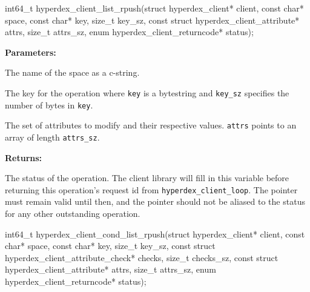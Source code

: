 \funcsep
\begin{ccode}
int64_t hyperdex_client_list_rpush(struct hyperdex_client* client,
                const char* space,
                const char* key, size_t key_sz,
                const struct hyperdex_client_attribute* attrs, size_t attrs_sz,
                enum hyperdex_client_returncode* status);
\end{ccode}
\funcdesc 

\noindent\textbf{Parameters:}
\begin{description}[labelindent=\widthof{{\texttt{attrs}, \texttt{attrs\_sz}}},leftmargin=*,noitemsep,nolistsep,align=right]
\item[\texttt{space}] The name of the space as a c-string.
\item[\texttt{key}, \texttt{key\_sz}] The key for the operation where \texttt{key} is a bytestring and \texttt{key\_sz} specifies the number of bytes in \texttt{key}.
\item[\texttt{attrs}, \texttt{attrs\_sz}] The set of attributes to modify and their respective values.  \texttt{attrs} points to an array of length \texttt{attrs\_sz}.
\end{description}

\noindent\textbf{Returns:}
\begin{description}[labelindent=\widthof{{\texttt{status}}},leftmargin=*,noitemsep,nolistsep,align=right]
\item[\texttt{status}] The status of the operation.  The client library will fill in this variable before returning this operation's request id from \texttt{hyperdex\_client\_loop}.  The pointer must remain valid until then, and the pointer should not be aliased to the status for any other outstanding operation.
\end{description}

\funcsep
\begin{ccode}
int64_t hyperdex_client_cond_list_rpush(struct hyperdex_client* client,
                const char* space,
                const char* key, size_t key_sz,
                const struct hyperdex_client_attribute_check* checks, size_t checks_sz,
                const struct hyperdex_client_attribute* attrs, size_t attrs_sz,
                enum hyperdex_client_returncode* status);
\end{ccode}
\funcdesc 

